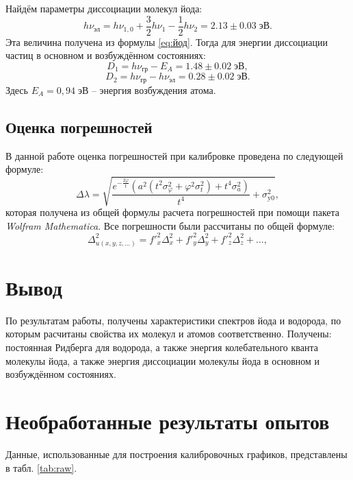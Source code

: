 \documentclass[a4paper]{article}
\renewcommand{\phi}{\varphi}
\begin{document}
	Найдём параметры диссоциации молекул йода:
	\[h\nu_{эл} = h\nu_{1, 0}+\dfrac{3}{2}h\nu_1 - \dfrac{1}{2}h\nu_2 = 2.13\pm 0.03\; эВ.\]
	Эта величина получена из формулы \eqref{eq:йод}. Тогда для энергии диссоциации частиц в основном и возбуждённом состояниях:
	\[D_1 = h\nu_{гр} - E_A = 1.48\pm 0.02\; эВ,\]
	\[D_2 = h\nu_{гр} - h\nu_{эл} = 0.28\pm 0.02\; эВ.\]
	Здесь $ E_A = 0,94\; эВ$ -- энергия возбуждения атома.
	
	\subsection{Оценка погрешностей}
		
	В данной работе оценка погрешностей при калибровке проведена по следующей формуле:
	\begin{equation}\label{eq:погр}
		\Delta \lambda = \sqrt{\frac{e^{-\frac{2 \phi}{t}} \left(a^2 \left(t^2 \sigma _\phi^2+\phi^2 \sigma _t^2\right)+t^4 \sigma _a^2\right)}{t^4}+\sigma _{\text{y0}}^2},
	\end{equation}	
	которая получена из общей формулы расчета погрешностей при помощи пакета \emph{Wolfram Mathematica}. Все погрешности были рассчитаны по общей формуле:
	\begin{equation}\label{eq:погрешности}
		\Delta_{u(x, y, z, \ldots)}^2 = f'^2_{x} \Delta_x^2 + f'^2_y \Delta_y^2 + f'^2_z \Delta_z^2 + \ldots,
	\end{equation}
	
	\section{Вывод}
	
	По результатам работы, получены характеристики спектров йода и водорода, по которым расчитаны свойства их молекул и атомов соответственно. Получены: постоянная Ридберга для водорода, а также энергия колебательного кванта молекулы йода, а также энергия диссоциации молекулы йода в основном и возбуждённом состояниях.
	
	\appendix
	\section{Необработанные результаты опытов}
	
	Данные, использованные для построения калибровочных графиков, представлены в табл. \ref{tab:raw}.
	
\end{document}
